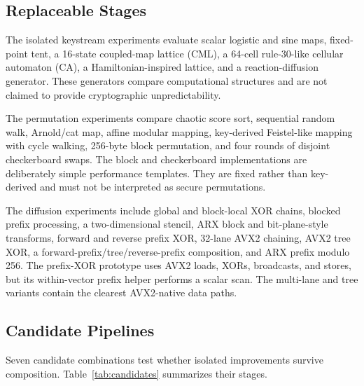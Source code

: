 \documentclass[twocolumn,runningheads]{svjour3}
\begin{document}
\subsection{Replaceable Stages}
The isolated keystream experiments evaluate scalar logistic and sine maps,
fixed-point tent, a 16-state coupled-map lattice (CML), a 64-cell
rule-30-like cellular automaton (CA), a Hamiltonian-inspired lattice, and a
reaction-diffusion generator. These generators compare computational
structures and are not claimed to provide cryptographic unpredictability.

The permutation experiments compare chaotic score sort, sequential random
walk, Arnold/cat map, affine modular mapping, key-derived Feistel-like mapping
with cycle walking, 256-byte block permutation, and four rounds of disjoint
checkerboard swaps. The block and checkerboard implementations are deliberately
simple performance templates. They are fixed rather than key-derived and must
not be interpreted as secure permutations.

The diffusion experiments include global and block-local XOR chains, blocked
prefix processing, a two-dimensional stencil, ARX block and bit-plane-style
transforms, forward and reverse prefix XOR, 32-lane AVX2 chaining, AVX2 tree
XOR, a forward-prefix/tree/reverse-prefix composition, and ARX prefix modulo
256. The prefix-XOR prototype uses AVX2 loads, XORs, broadcasts, and stores,
but its within-vector prefix helper performs a scalar scan. The multi-lane and
tree variants contain the clearest AVX2-native data paths.

\subsection{Candidate Pipelines}
Seven candidate combinations test whether isolated improvements survive
composition. Table~\ref{tab:candidates} summarizes their stages.
\end{document}
